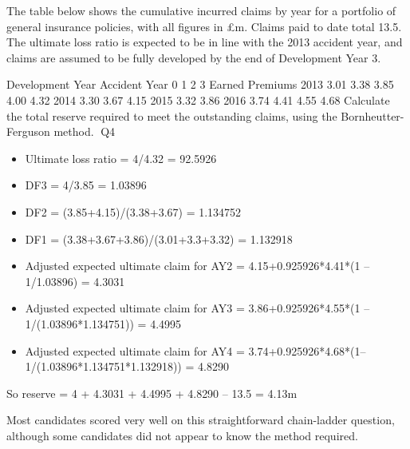 \documentclass[a4paper,12pt]{article}
\begin{document}
The table below shows the cumulative incurred claims by year for a portfolio of general insurance policies, with all figures in £m. Claims paid to date total 13.5. The ultimate loss ratio is expected to be in line with the 2013 accident year, and claims are
assumed to be fully developed by the end of Development Year 3.

Development Year
Accident Year 0 1 2 3 Earned Premiums
2013 3.01 3.38 3.85 4.00 4.32
2014 3.30 3.67 4.15 2015 3.32 3.86 2016 3.74
4.41
4.55
4.68
Calculate the total reserve required to meet the outstanding claims, using the
Bornheutter-Ferguson method.
\newpage
Q4
\begin{itemize}
\item Ultimate loss ratio = 4/4.32 = 92.5926%
\item DF3 = 4/3.85 = 1.03896 
\item DF2 = (3.85+4.15)/(3.38+3.67) = 1.134752 
\item DF1 = (3.38+3.67+3.86)/(3.01+3.3+3.32) = 1.132918 
\item Adjusted expected ultimate claim for
AY2 = 4.15+0.925926*4.41*(1 – 1/1.03896) = 4.3031 
\item Adjusted expected ultimate claim for AY3
= 3.86+0.925926*4.55*(1 – 1/(1.03896*1.134751)) = 4.4995 
\item Adjusted expected ultimate claim for AY4
= 3.74+0.925926*4.68*(1–1/(1.03896*1.134751*1.132918)) = 4.8290 \end{itemize}
So reserve = 4 + 4.3031 + 4.4995 + 4.8290 – 13.5 = 4.13m

Most candidates scored very well on this straightforward chain-ladder
question, although some candidates did not appear to know the method
required.
\end{document}
